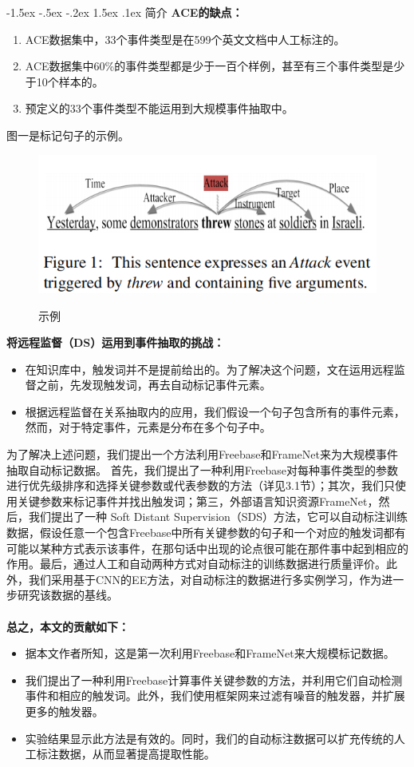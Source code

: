 \documentclass[UTF8]{ctexart}
\makeatletter
\newcommand{\sanhao}{\fontsize{15.75pt}{\baselineskip}\selectfont}
\renewcommand\section{\@startsection{section}{1}{\z@}%
	{-1.5ex \@plus -.5ex \@minus -.2ex}%
	{1.5ex \@plus .1ex}%
	{\normalfont\sanhao\CJKfamily{song}}}
\makeatother
\begin{document}
	\section{简介}
	\textbf{ACE的缺点：}  %
	\begin{enumerate}
		\item ACE数据集中，33个事件类型是在599个英文文档中人工标注的。
		\item ACE数据集中60\%的事件类型都是少于一百个样例，甚至有三个事件类型是少于10个样本的。
		\item 预定义的33个事件类型不能运用到大规模事件抽取中。
	\end{enumerate}
	图一是标记句子的示例。\\
	\begin{figure}[ht]
	\centering
	\includegraphics[width = .8\textwidth]{1.png} \\ %
	\caption{示例}
	\end{figure}

	\textbf{将远程监督（DS）运用到事件抽取的挑战：}
	\begin{itemize}
		\item 在知识库中，触发词并不是提前给出的。为了解决这个问题，文在运用远程监督之前，先发现触发词，再去自动标记事件元素。
		\item 根据远程监督在关系抽取内的应用，我们假设一个句子包含所有的事件元素，然而，对于特定事件，元素是分布在多个句子中。
	\end{itemize}
	
	为了解决上述问题，我们提出一个方法利用Freebase和FrameNet来为大规模事件抽取自动标记数据。
	首先，我们提出了一种利用Freebase对每种事件类型的参数进行优先级排序和选择关键参数或代表参数的方法（详见3.1节）；其次，我们只使用关键参数来标记事件并找出触发词；第三，外部语言知识资源FrameNet，然后，我们提出了一种 Soft Distant Supervision（SDS）方法，它可以自动标注训练数据，假设任意一个包含Freebase中所有关键参数的句子和一个对应的触发词都有可能以某种方式表示该事件，在那句话中出现的论点很可能在那件事中起到相应的作用。最后，通过人工和自动两种方式对自动标注的训练数据进行质量评价。此外，我们采用基于CNN的EE方法，对自动标注的数据进行多实例学习，作为进一步研究该数据的基线。\\
	\\
	\textbf{总之，本文的贡献如下：}
	\begin{itemize}
		\item 据本文作者所知，这是第一次利用Freebase和FrameNet来大规模标记数据。
		\item 我们提出了一种利用Freebase计算事件关键参数的方法，并利用它们自动检测事件和相应的触发词。此外，我们使用框架网来过滤有噪音的触发器，并扩展更多的触发器。
		\item 实验结果显示此方法是有效的。同时，我们的自动标注数据可以扩充传统的人工标注数据，从而显著提高提取性能。
	\end{itemize}
\end{document}
